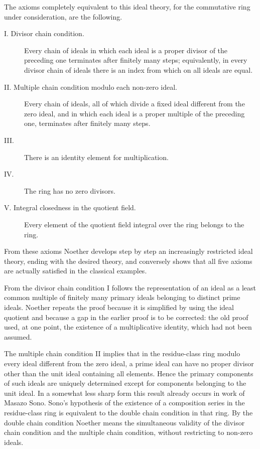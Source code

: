 \documentclass[11pt]{article}
\begin{document}
The axioms completely equivalent to this ideal theory, for the commutative ring under consideration, are the following.

\begin{description}
\item[I. Divisor chain condition.] Every chain of ideals in which each ideal is a proper divisor of the preceding one terminates after finitely many steps; equivalently, in every divisor chain of ideals there is an index from which on all ideals are equal.
\item[II. Multiple chain condition modulo each non-zero ideal.] Every chain of ideals, all of which divide a fixed ideal different from the zero ideal, and in which each ideal is a proper multiple of the preceding one, terminates after finitely many steps.
\item[III.] There is an identity element for multiplication.
\item[IV.] The ring has no zero divisors.
\item[V. Integral closedness in the quotient field.] Every element of the quotient field integral over the ring belongs to the ring.
\end{description}

From these axioms Noether develops step by step an increasingly restricted ideal theory, ending with the desired theory, and conversely shows that all five axioms are actually satisfied in the classical examples.

From the divisor chain condition I follows the representation of an ideal as a least common multiple of finitely many primary ideals belonging to distinct prime ideals. Noether repeats the proof because it is simplified by using the ideal quotient and because a gap in the earlier proof is to be corrected: the old proof used, at one point, the existence of a multiplicative identity, which had not been assumed.

The multiple chain condition II implies that in the residue-class ring modulo every ideal different from the zero ideal, a prime ideal can have no proper divisor other than the unit ideal containing all elements. Hence the primary components of such ideals are uniquely determined except for components belonging to the unit ideal. In a somewhat less sharp form this result already occurs in work of Masazo Sono. Sono's hypothesis of the existence of a composition series in the residue-class ring is equivalent to the double chain condition in that ring. By the double chain condition Noether means the simultaneous validity of the divisor chain condition and the multiple chain condition, without restricting to non-zero ideals.
\end{document}
